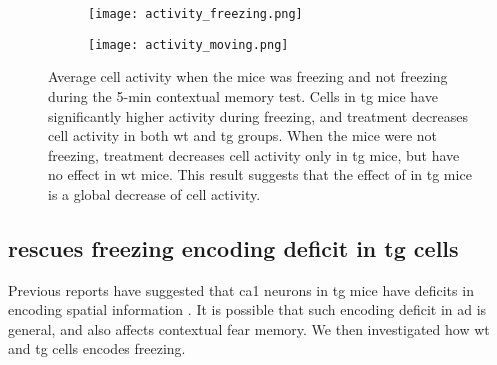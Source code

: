 \begin{figure}[h]
    \begin{subfigure}[h]{\textwidth}
        \texttt{[image: activity\_freezing.png]}
        \caption{\label{f.ad.actf}}
    \end{subfigure}
    \begin{subfigure}[h]{\textwidth}
        \texttt{[image: activity\_moving.png]}
        \caption{\label{f.ad.actnf}}
    \end{subfigure}
    \caption[Cell activity during freezing.]{Average cell activity when the mice was  freezing and  not freezing during the 5-min contextual memory test. Cells in \gls{tg} mice have significantly higher activity during freezing, and \tglu{} treatment decreases cell activity in both \gls{wt} and \gls{tg} groups. When the mice were not freezing, \tglu{} treatment decreases cell activity only in \gls{tg} mice, but have no effect in \gls{wt} mice. This result suggests that the effect of \tglu{} in \gls{tg} mice is a global decrease of cell activity. \label{f.ad.activity_freezing}}
\end{figure}
\begin{comment}
\begin{figure}[h]
    \texttt{[image: sample\_trace.png]}
    \caption{Sample calcium transients from cells with highest freezing information in a mouse. It appears that cells encode freezing by decreasing their activity. \label{f.ad.sample_trace}}
\end{figure}
\begin{figure}[h]
    \texttt{[image: ch\_activity.png]}
    \caption{Distribution and mean of activity difference between not-freezing and freezing. This confirms the intuition from Figure~\ref{f.ad.sample_trace} that most of the cells decrease activity during freezing. \label{f.ad.ch_activity}}
\end{figure}
\end{comment}

\subsection{\tglu{} rescues freezing encoding deficit in \gls{tg} cells}

Previous reports have suggested that \gls{ca1} neurons in \gls{tg} mice have deficits in encoding spatial information \citep{cheng13}. It is possible that such encoding deficit in \gls{ad} is general, and also affects contextual fear memory. We then investigated how \gls{wt} and \gls{tg} cells encodes freezing. 

